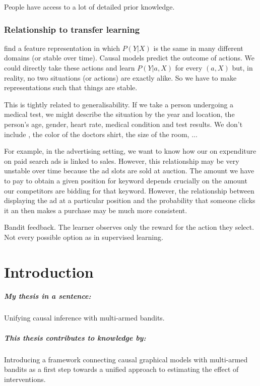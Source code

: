 \documentclass[11pt,a4paper,oneside]{book}
\theoremstyle{plain}
\theoremstyle{definition}
\begin{document}
People have access to a lot of detailed prior knowledge. 

\subsection*{Relationship to transfer learning}

find a feature representation in which $P(Y|X)$ is the same in many different domains (or stable over time). Causal models predict the outcome of actions. We could directly take these actions and learn $P(Y|a,X)$ for every $(a,X)$ but, in reality, no two situations (or actions) are exactly alike. So we have to make representations such that things are stable. 

This is tightly related to generalisability. If we take a person undergoing a medical test, we might describe the situation by the year and location, the person's age, gender, heart rate, medical condition and test results. We don't include , the color of the doctors shirt, the size of the room, ...

For example, in the advertising setting, we want to know how our on expenditure on paid search ads is linked to sales. However, this relationship may be very unstable over time because the ad slots are sold at auction. The amount we have to pay to obtain a given position for keyword depends crucially on the amount our competitors are bidding for that keyword. However, the relationship between displaying the ad at a particular position and the probability that someone clicks it an then makes a purchase may be much more consistent. 

Bandit feedback. The learner observes only the reward for the action they select. Not every possible option as in supervised learning.

\chapter{Introduction}

\paragraph*{My thesis in a sentence:} Unifying causal inference with multi-armed bandits.

\paragraph*{This thesis contributes to knowledge by:} Introducing a framework connecting causal graphical models with multi-armed bandits as a first step towards a unified approach to estimating the effect of interventions.  
\end{document}
